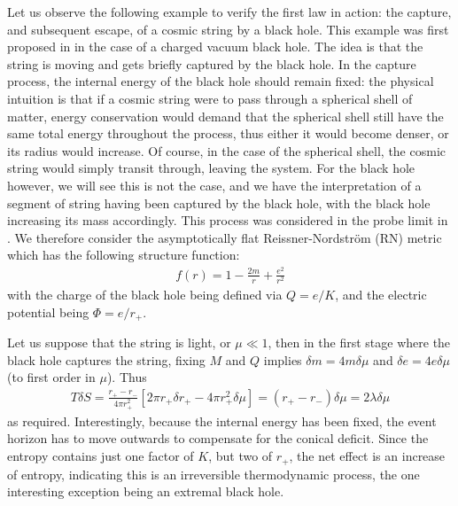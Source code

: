 \documentclass[
twoside,
openright,
frontopenright,
]{dmathesis}
\begin{document}
Let us observe the following example to verify the first law in action: the
capture, and subsequent escape, of a cosmic string by a black hole.  This
example was first proposed in \cite{Bonjour:1998rf} in the case of a charged
vacuum black hole.  The idea is that the string is moving and gets briefly
captured by the black hole. In the capture process, the internal energy of the
black hole should remain fixed: the physical intuition is that if a cosmic
string were to pass through a spherical shell of matter, energy conservation
would demand that the spherical shell still have the same total energy
throughout the process, thus either it would become denser, or its radius would
increase.  Of course, in the case of the spherical shell, the cosmic string
would simply transit through, leaving the system. For the black hole however, we
will see this is not the case, and we have the interpretation of a segment of
string having been captured by the black hole, with the black hole increasing
its mass accordingly. This process was considered in the probe limit in
\cite{Lonsdale:1988xd,DeVilliers:1997nk}. We therefore consider the
asymptotically flat Reissner-Nordstr\"om (RN) metric which has the following
structure function:
\begin{align}
f(r) = 1  - \frac{2m}{r} + \frac{e^2}{r^2}
\end{align}
with the charge of the black hole being defined via $Q = e/K$, and the electric
potential being $\Phi = e/r_+$.

Let us suppose that the string is light, or $\mu \ll 1$, then in the first stage
where the black hole captures the string, fixing $M$ and $Q$ implies
$\delta m = 4 m \delta \mu$ and $\delta e = 4e\delta \mu$ (to first order in
$\mu$). Thus
\begin{align}
T \delta S = \frac{r_+-r_-}{4\pi r_+^2} \left [
2\pi r_+ \delta r_+ - 4\pi r_+^2 \delta\mu \right ]
= (r_+-r_-) \delta \mu = 2\lambda \delta \mu
\end{align}
as required. Interestingly, because the internal energy has been fixed, the
event horizon has to move outwards to compensate for the conical deficit. Since
the entropy contains just one factor of $K$, but two of $r_+$, the net effect is
an increase of entropy, indicating this is an irreversible thermodynamic
process, the one interesting exception being an extremal black hole.
\end{document}

